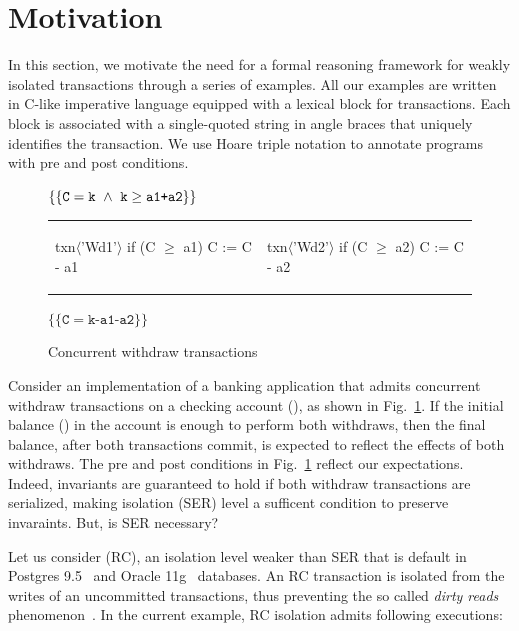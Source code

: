 \section{Motivation}

In this section, we motivate the need for a formal reasoning framework
for weakly isolated transactions through a series of examples. All our
examples are written in C-like imperative language equipped with a
 lexical block for transactions. Each  block is
associated with a single-quoted string in angle braces that uniquely
identifies the transaction. We use Hoare triple notation to annotate
programs with pre and post conditions.

\begin{figure}
\centering
$\{\{\texttt{C}=\texttt{k} ~\wedge~ \texttt{k}\ge\texttt{a1+a2}\}\}$
\begin{tabular}{l||l}
\begin{txnimpcode}
  txn$\langle$'Wd1'$\rangle${
    if (C $\ge$ a1) {
      C := C - a1
    }
  }
\end{txnimpcode}
&
\begin{txnimpcode}
  txn$\langle$'Wd2'$\rangle${
    if (C $\ge$ a2) {
      C := C - a2
    }
  }
\end{txnimpcode}
\\
\end{tabular}
$\{\{\texttt{C}=\texttt{k-a1-a2}\}\}$

\caption{Concurrent withdraw transactions}
\label{fig:motiv-eg-1}
\end{figure}

Consider an implementation of a banking application that admits
concurrent withdraw transactions on a checking account (), as
shown in Fig.~\ref{fig:motiv-eg-1}. If the initial balance () in
the account is enough to perform both withdraws, then the final
balance, after both transactions commit, is expected to reflect the
effects of both withdraws. The pre and post conditions in
Fig.~\ref{fig:motiv-eg-1} reflect our expectations. Indeed, invariants
are guaranteed to hold if both withdraw transactions are serialized,
making  isolation (SER) level a sufficent condition
to preserve invaraints. But, is SER necessary?

Let us consider  (RC), an isolation level weaker
than SER that is default in Postgres 9.5~\cite{postgres95} and Oracle
11g~\cite{oracle11g} databases. An RC transaction is isolated from the
writes of an uncommitted transactions, thus preventing the so called
\emph{dirty reads} phenomenon~\cite{berenson}. In the current example,
RC isolation admits following executions:

